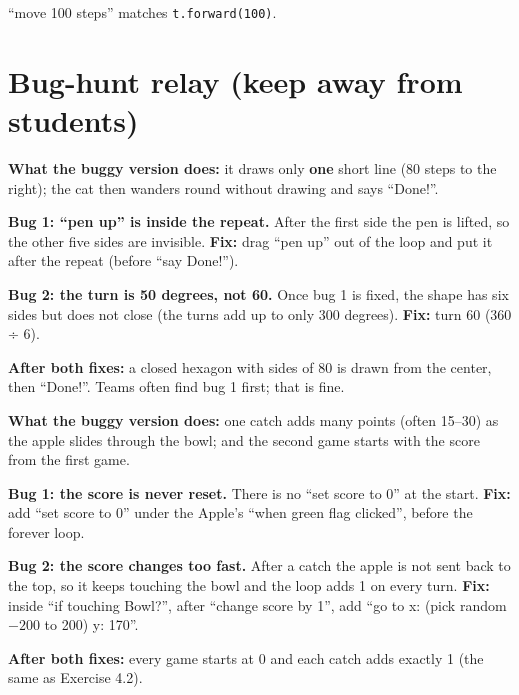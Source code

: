 \begin{answer}
\enquote{move 100 steps} matches \texttt{t.forward(100)}.
\end{answer}

\section{Bug-hunt relay (keep away from students)}
\begin{answer}
\textbf{What the buggy version does:} it draws only \textbf{one} short line (80 steps to the right); the cat then wanders round without drawing and says \enquote{Done!}.

\textbf{Bug 1: \enquote{pen up} is inside the repeat.} After the first side the pen is lifted, so the other five sides are invisible. \textbf{Fix:} drag \enquote{pen up} out of the loop and put it after the repeat (before \enquote{say Done!}).

\textbf{Bug 2: the turn is 50 degrees, not 60.} Once bug 1 is fixed, the shape has six sides but does not close (the turns add up to only 300 degrees). \textbf{Fix:} turn 60 (360 ÷ 6).

\textbf{After both fixes:} a closed hexagon with sides of 80 is drawn from the center, then \enquote{Done!}. Teams often find bug 1 first; that is fine.
\end{answer}

\begin{answer}
\textbf{What the buggy version does:} one catch adds many points (often 15--30) as the apple slides through the bowl; and the second game starts with the score from the first game.

\textbf{Bug 1: the score is never reset.} There is no \enquote{set score to 0} at the start. \textbf{Fix:} add \enquote{set score to 0} under the Apple's \enquote{when green flag clicked}, before the forever loop.

\textbf{Bug 2: the score changes too fast.} After a catch the apple is not sent back to the top, so it keeps touching the bowl and the loop adds 1 on every turn. \textbf{Fix:} inside \enquote{if touching Bowl?}, after \enquote{change score by 1}, add \enquote{go to x: (pick random $-200$ to 200) y: 170}.

\textbf{After both fixes:} every game starts at 0 and each catch adds exactly 1 (the same as Exercise 4.2).
\end{answer}

